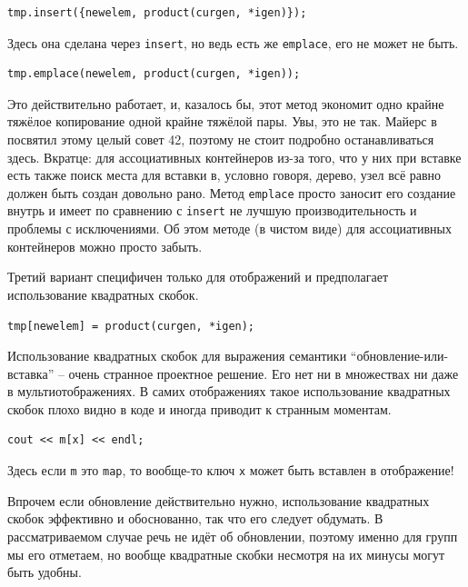 \documentclass[a4paper,12pt,oneside]{book}
\begin{document}
\begin{lstlisting}
tmp.insert({newelem, product(curgen, *igen)});
\end{lstlisting}

Здесь она сделана через \lstinline!insert!, но ведь есть же \lstinline!emplace!, его не может не быть.

\begin{lstlisting}
tmp.emplace(newelem, product(curgen, *igen));
\end{lstlisting}

Это действительно работает, и, казалось бы, этот метод экономит одно крайне тяжёлое копирование одной крайне тяжёлой пары. Увы, это не так. Майерс в \cite{effmoderncpp} посвятил этому целый совет 42, поэтому не стоит подробно останавливаться здесь. Вкратце: для ассоциативных контейнеров из-за того, что у них при вставке есть также поиск места для вставки в, условно говоря, дерево, узел всё равно должен быть создан довольно рано. Метод \lstinline!emplace! просто заносит его создание внутрь и имеет по сравнению с \lstinline!insert! не лучшую производительность и проблемы с исключениями. Об этом методе (в чистом виде) для ассоциативных контейнеров можно просто забыть.

Третий вариант специфичен только для отображений и предполагает использование квадратных скобок.

\begin{lstlisting}
tmp[newelem] = product(curgen, *igen);
\end{lstlisting}

Использование квадратных скобок для выражения семантики ``обновление-или-вставка'' -- очень странное проектное решение. Его нет ни в множествах ни даже в мультиотображениях. В самих отображениях такое использование квадратных скобок плохо видно в коде и иногда приводит к странным моментам.

\begin{lstlisting}
cout << m[x] << endl;
\end{lstlisting}

Здесь если \lstinline!m! это \lstinline!map!, то вообще-то ключ \lstinline!x! может быть вставлен в отображение!

Впрочем если обновление действительно нужно, использование квадратных скобок эффективно и обоснованно, так что его следует обдумать. В рассматриваемом случае речь не идёт об обновлении, поэтому именно для групп мы его отметаем, но вообще квадратные скобки несмотря на их минусы могут быть удобны.
\end{document}
